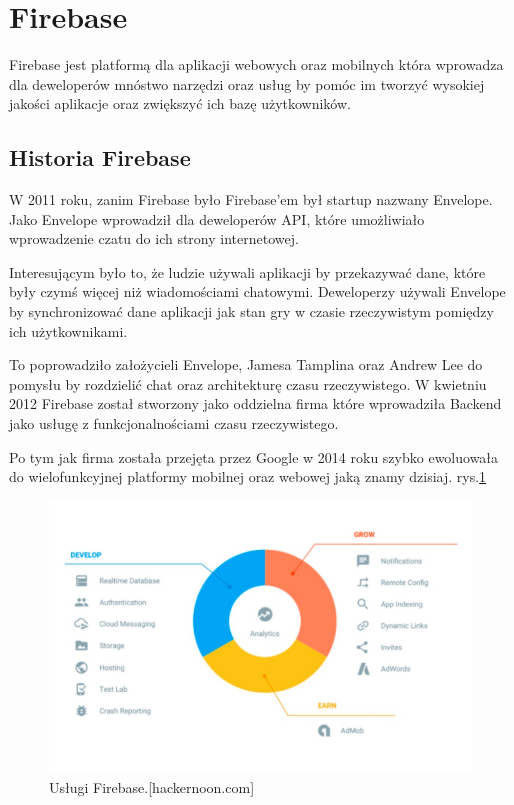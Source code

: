 \section{Firebase}

Firebase jest platformą dla aplikacji webowych oraz mobilnych która wprowadza dla deweloperów mnóstwo narzędzi oraz usług by pomóc im tworzyć wysokiej jakości aplikacje oraz zwiększyć ich bazę użytkowników.

\subsection{Historia Firebase}

W 2011 roku, zanim Firebase było Firebase’em był startup nazwany Envelope. Jako Envelope  wprowadził dla deweloperów API, które umożliwiało wprowadzenie czatu do ich strony internetowej.

Interesującym było to, że ludzie używali aplikacji by przekazywać dane, które były czymś więcej niż wiadomościami chatowymi. Deweloperzy używali Envelope by synchronizować dane aplikacji jak stan gry w czasie rzeczywistym pomiędzy ich użytkownikami.

To poprowadziło założycieli Envelope, Jamesa Tamplina oraz Andrew Lee do pomysłu by rozdzielić chat oraz architekturę czasu rzeczywistego. W kwietniu 2012 Firebase został stworzony jako oddzielna firma które wprowadziła Backend jako usługę z funkcjonalnościami czasu rzeczywistego. 

Po tym jak firma została przejęta przez Google w 2014 roku szybko ewoluowała do wielofunkcyjnej platformy mobilnej oraz webowej jaką znamy dzisiaj. rys.\ref{rys:firebase}

\begin{figure}
\centering\includegraphics[width=.6\textwidth]{img/firebase}
\caption{Usługi Firebase.[hackernoon.com]}  \label{rys:firebase}%
\end{figure}

